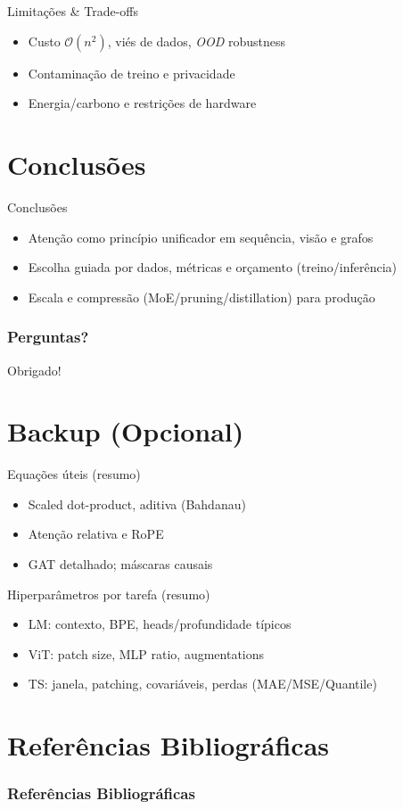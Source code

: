 \documentclass{beamer}
\begin{document}
\begin{frame}{Limitações \& Trade-offs}
	\begin{itemize}[<+->]
		\item Custo $\mathcal{O}(n^2)$, viés de dados, \textit{OOD} robustness
		\item Contaminação de treino e privacidade
		\item Energia/carbono e restrições de hardware
	\end{itemize}
\end{frame}

\section{Conclusões}
\begin{frame}{Conclusões}
	\begin{itemize}[<+->]
		\item Atenção como princípio unificador em sequência, visão e grafos
		\item Escolha guiada por dados, métricas e orçamento (treino/inferência)
		\item Escala e compressão (MoE/pruning/distillation) para produção
	\end{itemize}
\end{frame}

\backmatter
\begin{frame}
	\frametitle{Perguntas?}
	\centering
	Obrigado!
\end{frame}

\section{Backup (Opcional)}
\begin{frame}{Equações úteis (resumo)}
	\small
	\begin{itemize}
		\item Scaled dot-product, aditiva (Bahdanau)
		\item Atenção relativa e RoPE
		\item GAT detalhado; máscaras causais
	\end{itemize}
\end{frame}

\begin{frame}{Hiperparâmetros por tarefa (resumo)}
	\small
	\begin{itemize}
		\item LM: contexto, BPE, heads/profundidade típicos
		\item ViT: patch size, MLP ratio, augmentations
		\item TS: janela, patching, covariáveis, perdas (MAE/MSE/Quantile)
	\end{itemize}
\end{frame}

\section{Referências Bibliográficas}
\begin{frame}[allowframebreaks]
	\frametitle{Referências Bibliográficas}
	
	
\end{frame}
\end{document}
